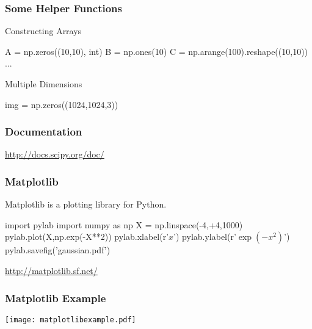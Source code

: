 \begin{frame}[fragile]
\frametitle{Some Helper Functions}

\begin{block}{Constructing Arrays}
\begin{python}
A = np.zeros((10,10), int)
B = np.ones(10)
C = np.arange(100).reshape((10,10))
...
\end{python}
\end{block}

\begin{block}{Multiple Dimensions}
\begin{python}
img = np.zeros((1024,1024,3))
\end{python}
\end{block}

\end{frame}


\begin{frame}[fragile]
\frametitle{Documentation}

\href{http://docs.scipy.org/doc/}{http://docs.scipy.org/doc/}

\end{frame}

\begin{frame}[fragile]
\frametitle{Matplotlib}
Matplotlib is a \alert{plotting library} for Python.

\begin{python}
import pylab
import numpy as np
X = np.linspace(-4,+4,1000)
pylab.plot(X,np.exp(-X**2))
pylab.xlabel(r'$x$')
pylab.ylabel(r'$\exp(-x^{2})$')
pylab.savefig('gaussian.pdf')
\end{python}

\centering
\href{http://matplotlib.sf.net/}{http://matplotlib.sf.net/}

\end{frame}

\begin{frame}[fragile]
\frametitle{Matplotlib Example}

\centering
\texttt{[image: matplotlibexample.pdf]}

\end{frame}


